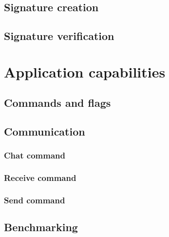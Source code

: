 \section{Signature creation}
\label{sec:dil_sign}


\section{Signature verification}
\label{sec:dil_verify}


\chapter{Application capabilities}
\label{ch:app_capab}


\section{Commands and flags}
\label{sec:options}


\section{Communication}
\label{sec:cmd_app}


\subsection{Chat command}
\label{subsec:cmd_app_chat}


\subsection{Receive command}
\label{sec:cmd_app_recv}


\subsection{Send command}
\label{sec:cmd_app_send}


\section{Benchmarking}
\label{sec:cmd_benchmark}


